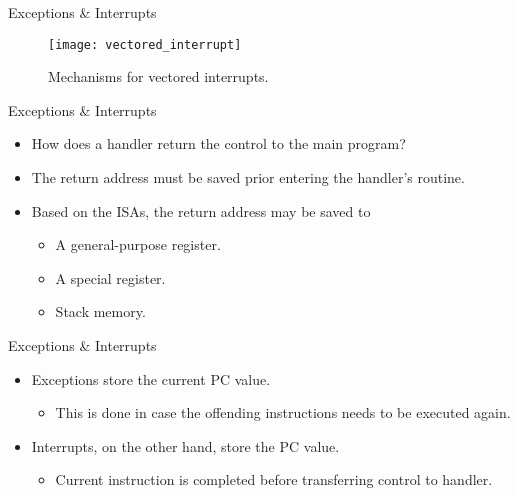 % 
\begin{frame}{Exceptions \& Interrupts}{}
\begin{figure}
\centering
\texttt{[image: vectored\_interrupt]}
\caption{Mechanisms for vectored interrupts.}
\label{Figure:vectored_interrupt}
\end{figure}
\end{frame}


% 
\begin{frame}{Exceptions \& Interrupts}{}
\begin{itemize}
\item How does a handler return the control to the main program?
\pauseprint
\item The return address must be saved prior entering the handler's routine.
\item Based on the \acp{ISA}, the return address may be saved to
\begin{itemize}
\item A general-purpose register.
\item A special register.
\item Stack memory.
\end{itemize} 

\end{itemize}
\end{frame}


% 
\begin{frame}{Exceptions \& Interrupts}{}
\begin{itemize}
\item Exceptions store the current \ac{PC} value.
\begin{itemize}
\item This is done in case the offending instructions needs to be executed again.
\end{itemize}
\item Interrupts, on the other hand, store the  \ac{PC} value.
\begin{itemize}
\item Current instruction is completed before transferring control to handler.
\end{itemize}
\end{itemize}
\end{frame}

